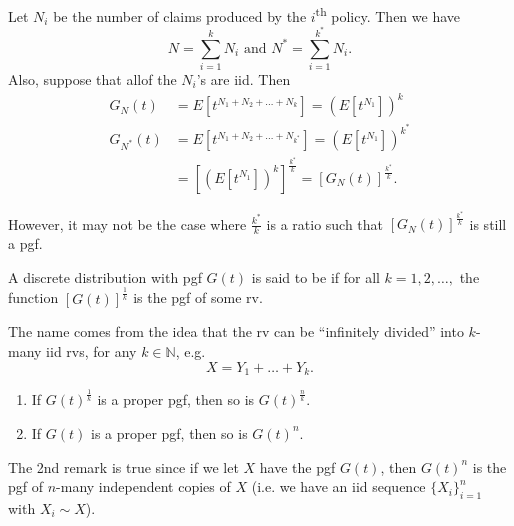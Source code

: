 \documentclass[notoc,notitlepage]{tufte-book}
\begin{document}
\begin{eg}
  Let $N_i$ be the number of claims produced by the $i$\textsuperscript{th} policy. Then we have
  \begin{equation*}
    N = \sum_{i=1}^{k} N_i \text{ and } N^* = \sum_{i=1}^{k^*} N_i.
  \end{equation*}
  Also, suppose that allof the $N_i$'s are iid. Then
  \begin{align*}
    G_N(t) &= E \left[ t^{N_1 + N_2 + \hdots + N_k} \right] = \left( E \left[ t^{N_1} \right] \right)^k \\
    G_{N^*}(t) &= E \left[ t^{N_1 + N_2 + \hdots + N_{k^*}} \right] = \left( E \left[ t^{N_1} \right] \right)^{k^*} \\
               &= \left[ \left( E \left[ t^{N_1} \right] \right)^k \right]^{\frac{k^*}{k}} = \left[ G_N(t) \right]^{\frac{k^*}{k}}.
  \end{align*}
\end{eg}

However, it may not be the case where $\frac{k^*}{k}$ is a ratio such that $\left[ G_N(t) \right]^{\frac{k^*}{k}}$ is still a pgf.

\begin{defn}\label{defn:infinitely_divisible}
  A discrete distribution with pgf $G(t)$ is said to be  if for all $k =1, 2, \ldots,$ the function $\left[ G(t) \right]^{\frac{1}{k}}$ is the pgf of some rv.
\end{defn}

\begin{remark}[Namesake]
  The name comes from the idea that the rv can be ``infinitely divided'' into $k$-many iid rvs, for any $k \in \mathbb{N}$, e.g.
  \begin{equation*}
    X = Y_1 + \hdots + Y_k.
  \end{equation*}
\end{remark}

\begin{remark}
  \begin{enumerate}
    \item If $G(t)^\frac{1}{k}$ is a proper pgf, then so is $G(t)^\frac{n}{k}$.
    \item If $G(t)$ is a proper pgf, then so is $G(t)^n$.
  \end{enumerate}

  The 2nd remark is true since if we let $X$ have the pgf $G(t)$, then $G(t)^n$ is the pgf of $n$-many independent copies of $X$ (i.e. we have an iid sequence $\{ X_i \}_{i = 1}^{n}$ with $X_i \sim X$).
\end{remark}
\end{document}
